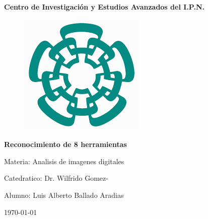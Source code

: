 \documentclass[a4paper, 11pt]{article}
\begin{document}

\begin{titlepage}
  \clearpage\thispagestyle{empty}
  \centering
  \vspace{1cm}
  {\Huge \textbf{Centro de Investigación y Estudios Avanzados del I.P.N.} \par}
  \vspace{1cm}

  \begin{figure}[h!]
    \centering
    \includegraphics[scale=0.5]{cinves.png}
  \end{figure}
    
  \vspace{1cm}
         {\Huge \textbf{Reconocimiento de 8 herramientas}\par} 
         \vspace{4cm}
                {\Large Materia: Analisis de imagenes digitales \par} 
                \vspace{3cm}
                {\Large Catedratico: Dr. Wilfrido Gomez- \par} 
                \vspace{1cm}
                {\Large Alumno: Luis Alberto Ballado Aradias \par} 
                
                \vspace{3cm}
                       {\normalsize \today \par}
                       
    
  
\end{titlepage}

\tableofcontents{}

\pagebreak
\renewcommand\lstlistlistingname{List of Code}
\lstlistoflistings

\pagebreak
\end{document}
